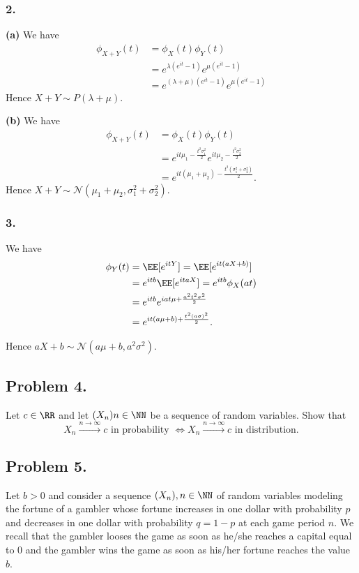 \subsubsection*{2.}

\textbf{(a)} We have 
\begin{align*}
\phi_{X+Y}(t) 
&= \phi_X(t)\phi_Y(t)\\
&= e^{\lambda(e^{it}-1)}e^{\mu(e^{it}-1)}\\
&=e^{(\lambda+\mu)(e^{it}-1)}e^{\mu(e^{it}-1)}
\end{align*}
Hence $X+Y\sim P(\lambda+\mu)$.

\textbf{(b)} We have 
\begin{align*}
\phi_{X+Y}(t) 
&= \phi_X(t)\phi_Y(t)\\
&= e^{it\mu_1 - \frac{t^2\sigma_1^2}{2}}e^{it\mu_2 - \frac{t^2\sigma_2^2}{2}}\\
&=e^{it(\mu_1+\mu_2) - \frac{t^2(\sigma_1^2+\sigma_2^2)}{2}}.
\end{align*}
Hence $X+Y\sim \mathcal{N}(\mu_1+\mu_2, \sigma_1^2+\sigma_2^2)$.

\subsubsection*{3.} We have
\begin{align*}
 \phi_Y(t) 
 &= \EE[e^{itY}] = \EE[e^{it(aX+b)}]\\
 &= e^{itb}\EE[e^{itaX}] = e^{itb}\phi_X(at)\\
 &= e^{itb} e^{iat\mu + \frac{a^2t^2\sigma^2}{2}}\\
 &= e^{it(a\mu+b) + \frac{t^2(a\sigma)^2}{2}}.
\end{align*}

Hence $aX+b\sim\mathcal{N}(a\mu+b, a^2\sigma^2)$.

\subsection*{Problem 4.} Let $c\in\RR$ and let $(X_n)n\in\NN$ be a sequence of random variables. Show that
$$X_n\xrightarrow{n\to\infty}c
 \text{ in probability } \Leftrightarrow X_n\xrightarrow{n\to\infty}c \text{ in distribution}.$$

 \subsection*{Problem 5.} Let $b > 0$ and consider a sequence $(X_n),n\in\NN$ of random variables modeling the fortune of a gambler whose fortune increases in one dollar with probability $p$ and decreases in one dollar with probability $q = 1 - p$ at each game period $n$. We recall that the gambler looses the game as soon as he/she reaches a capital equal to $0$ and the gambler wins the game as soon as his/her fortune reaches the value $b$. 
 
